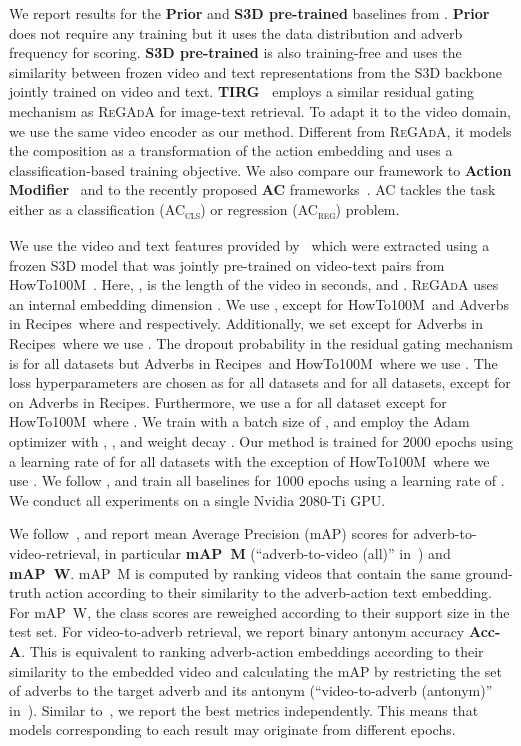 \documentclass[table]{bmvc2k}
\newcommand{\modelName}{\textsc{ReGAdA}\xspace}
\newcommand{\howto}{HowTo100M}
\newcommand{\air}{Adverbs in Recipes}
\newcommand{\accls}{AC\textsubscript{\textsc{cls}}}
\newcommand{\acreg}{AC\textsubscript{\textsc{reg}}}
\begin{document}
We report results for the \textbf{Prior} and \textbf{S3D pre-trained} baselines from \cite{moltisanti2023learning}. \textbf{Prior} does not require any training but it uses the data distribution and adverb frequency for scoring. 
\textbf{S3D pre-trained} is also training-free and uses the similarity between frozen video and text representations from the S3D backbone jointly trained on video and text.
\textbf{TIRG~\cite{vo2019composing}} employs a similar residual gating mechanism as \modelName for image-text retrieval. To adapt it to the video domain, we use the same video encoder as our method. Different from \modelName, it models the composition as a transformation of the action embedding and uses a classification-based training objective.
We also compare our framework to \textbf{Action Modifier}~\cite{doughty_action_2020} and to the recently proposed \textbf{AC} frameworks~\cite{moltisanti2023learning}. AC tackles the task either as a classification (\accls) or regression (\acreg) problem. 

 \label{implementation_details}
We use the video and text features provided by~\cite{moltisanti2023learning} which were extracted using a frozen S3D model that was jointly pre-trained on video-text pairs from HowTo100M~\cite{miech2019howto100m}. Here, ,  is the length of the video in seconds, and .
\modelName uses an internal embedding dimension .
We use , except for \howto\ and \air\ where  and  respectively. Additionally, we set  except for \air\ where we use . The dropout probability in the residual gating mechanism is  for all datasets but \air\ and \howto\ where we use . The loss hyperparameters are chosen as  for all datasets and  for all datasets, except for  on \air. Furthermore, we use a  for all dataset except for \howto\ where .
We train with a batch size of , and employ the Adam~\cite{kingma2014adam} optimizer with , , and weight decay . Our method is trained for 2000 epochs using a learning rate of  for all datasets with the exception of \howto\ where we use . We follow \cite{moltisanti2023learning}, and train all baselines for 1000 epochs using a learning rate of . 
We conduct all experiments on a single Nvidia 2080-Ti GPU. 


We follow~\cite{moltisanti2023learning}, and report mean Average Precision (mAP) scores for adverb-to-video-retrieval, in particular \textbf{mAP~M} (``adverb-to-video (all)'' in~\cite{doughty_action_2020}) and \textbf{mAP~W}. mAP~M is computed by ranking videos that contain the same ground-truth action according to their similarity to the adverb-action text embedding.
For mAP~W, the class scores are reweighed according to their support size in the test set. 
For video-to-adverb retrieval, we report binary antonym accuracy \textbf{Acc-A}. This is equivalent to ranking adverb-action embeddings according to their similarity to the embedded video and calculating the mAP by restricting the set of adverbs to the target adverb and its antonym (``video-to-adverb (antonym)'' in~\cite{doughty_action_2020}).
Similar to~\cite{moltisanti2023learning}, we report the best metrics independently. This means that models corresponding to each result may originate from different epochs.
\end{document}
